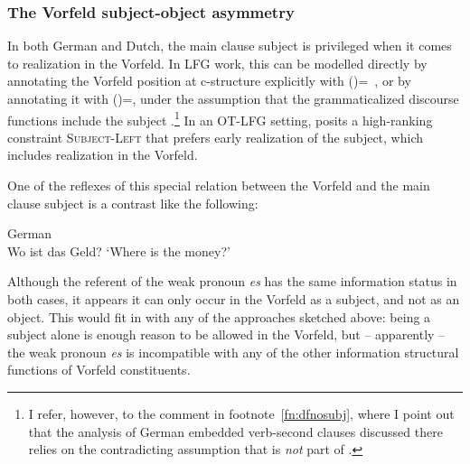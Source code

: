 \documentclass[output=paper,hidelinks]{langscibook}
\begin{document}
\subsubsection{The Vorfeld subject-object asymmetry\label{sec:Germanic:vfsubobjasym}}

In both German and Dutch, the main clause subject is privileged when it
comes to realization in the Vorfeld. In LFG work, this can be modelled
directly by annotating the Vorfeld position at c-structure explicitly
with (\UP\SUBJ)=\DOWN\ \citep{theiler-bouma:2012:lfg}, or by
annotating it with (\UP\DF)=\DOWN, under the assumption that the
grammaticalized discourse functions include the subject
\citep[§3.2.1]{Berman2003}.\footnote{I refer, however, to the comment in footnote~\ref{fn:dfnosubj}, where I point out that the analysis of German embedded verb-second clauses discussed there relies on the contradicting assumption that \SUBJ is \textit{not} part of \DF.} In an OT-LFG setting, \citet{Choi2001} posits
a high-ranking constraint \textsc{Subject-Left} that prefers early
realization of the subject, which includes realization in the Vorfeld.

One of the reflexes of this special relation between the Vorfeld and the main clause
subject is a contrast like the following:
%
\begin{exe}
  \ex German \citep{meinunger:2007:li}\\
  Wo ist das Geld?
  \glt `Where is the money?'
  \begin{xlist}
  \end{xlist}
\end{exe}
%
Although the referent of the weak pronoun \textit{es} has the same
information status in both cases, it appears it can only occur in the
Vorfeld as a subject, and not as an object. This would fit in with any
of the approaches sketched above: being a subject alone is enough
reason to be allowed in the Vorfeld, but -- apparently -- the weak
pronoun \textit{es} is incompatible with any of the other information
structural functions of Vorfeld constituents.
\end{document}
